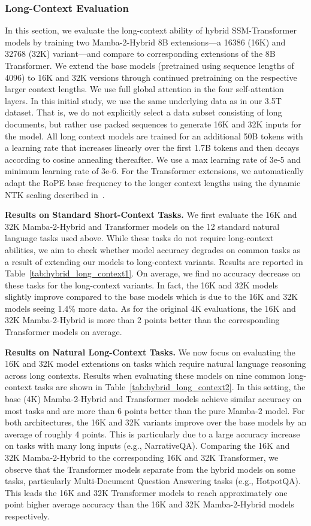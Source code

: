 \subsubsection{Long-Context Evaluation} In this section, we evaluate the long-context ability of hybrid SSM-Transformer models by training two Mamba-2-Hybrid 8B extensions---a 16386 (16K) and 32768 (32K) variant---and compare to corresponding extensions of the 8B Transformer. We extend the base models (pretrained using sequence lengths of 4096) to 16K and 32K versions through continued pretraining on the respective larger context lengths. We use full global attention in the four self-attention layers. In this initial study, we use the same underlying data as in our 3.5T dataset. That is, we do not explicitly select a data subset consisting of long documents, but rather use packed sequences to generate 16K and 32K inputs for the model. All long context models are trained for an additional 50B tokens with a learning rate that increases linearly over the first 1.7B tokens and then decays according to cosine annealing thereafter. We use a max learning rate of 3e-5 and minimum learning rate of 3e-6. For the Transformer extensions, we automatically adapt the RoPE base frequency to the longer context lengths using the dynamic NTK scaling described in~\citep{bloc972023ntkrope}.

\textbf{Results on Standard Short-Context Tasks.} We first evaluate the 16K and 32K Mamba-2-Hybrid and Transformer models on the 12 standard natural language tasks used above. While these tasks do not require long-context abilities, we aim to check whether model accuracy degrades on common tasks as a result of extending our models to long-context variants. Results are reported in Table~\ref{tab:hybrid_long_context1}. On average, we find no accuracy decrease on these tasks for the long-context variants. In fact, the 16K and 32K models slightly improve compared to the base models which is due to the 16K and 32K models seeing 1.4\% more data. As for the original 4K evaluations, the 16K and 32K Mamba-2-Hybrid is more than 2 points better than the corresponding Transformer models on average.

\textbf{Results on Natural Long-Context Tasks.} We now focus on evaluating the 16K and 32K model extensions on tasks which require natural language reasoning across long contexts. Results when evaluating these models on nine common long-context tasks are shown in Table~\ref{tab:hybrid_long_context2}. In this setting, the base (4K) Mamba-2-Hybrid and Transformer models achieve similar accuracy on most tasks and are more than 6 points better than the pure Mamba-2 model. For both architectures, the 16K and 32K variants improve over the base models by an average of roughly 4 points. This is particularly due to a large accuracy increase on tasks with many long inputs (e.g., NarrativeQA). Comparing the 16K and 32K Mamba-2-Hybrid to the corresponding 16K and 32K Transformer, we observe that the Transformer models separate from the hybrid models on some tasks, particularly Multi-Document Question Answering tasks (e.g., HotpotQA). This leads the 16K and 32K Transformer models to reach approximately one point higher average accuracy than the 16K and 32K Mamba-2-Hybrid models respectively. 

